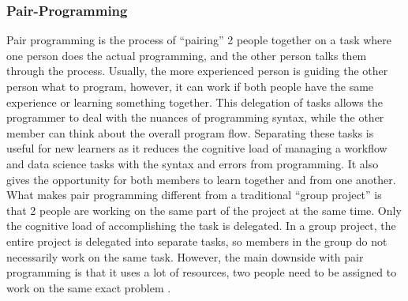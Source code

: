 \documentclass[010-intro.tex]{subfiles}
\begin{document}
        \subsubsection{Pair-Programming}

        Pair programming is the process of ``pairing'' 2 people together on a task
        where one person does the actual programming, and the other person
        talks them through the process. Usually, the more experienced person is
        guiding the other person what to program, however, it can work if both
        people have the same experience or learning something together. This
        delegation of tasks allows the programmer to deal with the nuances of
        programming syntax, while the other member can think about the overall
        program flow. Separating these tasks is useful for new learners as it
        reduces the cognitive load of managing a workflow and data science tasks
        with the syntax and errors from programming. It also gives the
        opportunity for both members to learn together and from one another.
        What makes pair programming different from a traditional ``group project''
        is that 2 people are working on the same part of the project at the same
        time. Only the cognitive load of accomplishing the task is delegated. In
        a group project, the entire project is delegated into separate tasks, so
        members in the group do not necessarily work on the same task. However,
        the main downside with pair programming is that it uses a lot of
        resources, two people need to be assigned to work on the same exact
        problem
        \cite{wilson2019teaching, hermansProgrammerBrain2021}.
\end{document}
